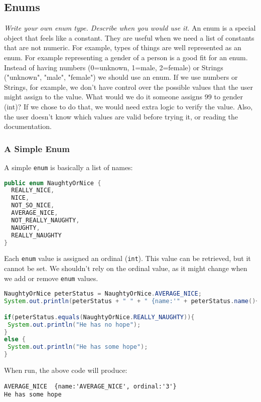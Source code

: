 \subsection{Enums}
\textit{Write your own enum type.  Describe when you would use it.}
An enum is a special object that feels like a constant. They are useful when we need a list of constants that are not numeric. For example, types of things are well represented as an enum. For example representing a gender of a person is a good fit for an enum. Instead of having numbers (0=unknown, 1=male, 2=female) or Strings ("unknown", "male", "female") we should use an enum. If we use numbers or Strings, for example, we don't have control over the possible values that the user might assign to the value. What would we do it someone assigns 99 to gender (int)? If we chose to do that, we would need extra logic to verify the value. Also, the user doesn't know which values are valid before trying it, or reading the documentation.

\subsubsection{A Simple Enum}
A simple \lstinline[columns=fixed]{enum} is basically a list of names:
\begin{lstlisting}[language=Java]
public enum NaughtyOrNice {
  REALLY_NICE,
  NICE,
  NOT_SO_NICE,
  AVERAGE_NICE,
  NOT_REALLY_NAUGHTY,
  NAUGHTY,
  REALLY_NAUGHTY
}
\end{lstlisting}

Each \lstinline[columns=fixed]{enum} value is assigned an ordinal (\lstinline[columns=fixed]{int}). This value can be retrieved, but it cannot be set. We shouldn't rely on the ordinal value, as it might change when we add or remove \lstinline[columns=fixed]{enum} values.

\begin{lstlisting}[language=Java]
NaughtyOrNice peterStatus = NaughtyOrNice.AVERAGE_NICE;
System.out.println(peterStatus + " " + " {name:'" + peterStatus.name()+ "', ordinal:'" + peterStatus.ordinal() +"'}");

if(peterStatus.equals(NaughtyOrNice.REALLY_NAUGHTY)){
 System.out.println("He has no hope");
}
else {
 System.out.println("He has some hope");
}
\end{lstlisting}

When run, the above code will produce:
\begin{lstlisting}
AVERAGE_NICE  {name:'AVERAGE_NICE', ordinal:'3'}
He has some hope
\end{lstlisting}

